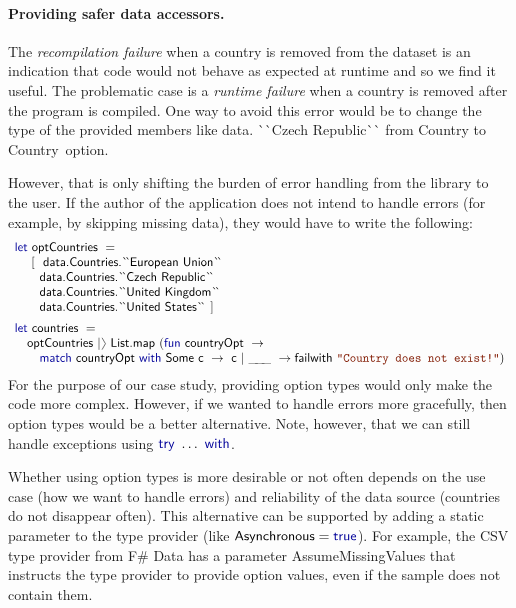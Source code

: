 \documentclass[submission,copyright,creativecommons]{eptcs}
\newcommand{\rangl}{\begin{picture}(4.5,7)
\put(.9,2.5){\rotatebox{120}{\line(1,0){5.5}}}
\put(.9,2.5){\rotatebox{240}{\line(1,0){5.5}}}
\end{picture}}
\newcommand{\ignp}{\_\kern-.5ex\_\kern-.5ex\_ }
\newcommand{\kvd}[1]{\textnormal{\textcolor{kvdclr}{\sffamily #1}}}
\newcommand{\str}[1]{\textnormal{\textcolor{strclr}{\ttfamily "#1"}}}
\newcommand{\ident}[1]{\textnormal{\sffamily #1}}
\newcommand{\lident}[1]{\textnormal{\sffamily
  \`{}\hspace{-0.25em}\`{}\hspace{-0.1em}#1\`{}\hspace{-0.25em}\`{}}}
\begin{document}
\vspace{-1em}
\paragraph{Providing safer data accessors.}
The \emph{recompilation failure} when a country is removed from the dataset is an indication that
code would not behave as expected at runtime and so we find it useful. The problematic case is
a \emph{runtime failure} when a country is removed after the program is compiled. One way to
avoid this error would be to change the type of the provided members like
\ident{data.}\lident{Czech Republic} from \ident{Country} to \ident{Country~option}.

However, that is only shifting the burden of error handling from the library to the user. If the
author of the application does not intend to handle errors (for example, by skipping missing data),
they would have to write the following:
%
\begin{equation*}
\begin{array}{l}
 \kvd{let}~\ident{optCountries}~= \\
 \quad~\lbrack~~ \ident{data.Countries.}\lident{European Union} \\
 \qquad   \ident{data.Countries.}\lident{Czech Republic} \\
 \qquad   \ident{data.Countries.}\lident{United Kingdom} \\
 \qquad   \ident{data.Countries.}\lident{United States} ~\rbrack
\\[0.5em]
 \kvd{let}~\ident{countries}~=\\
  \quad \ident{optCountries}~|\rangl~\ident{List.map}~(\kvd{fun}~\ident{countryOpt}~\rightarrow \\
  \qquad \kvd{match}~\ident{countryOpt}~\kvd{with}~\ident{Some~c}~\rightarrow~\ident{c}~|~\ignp~\rightarrow
    \ident{failwith}~\str{Country does not exist!})
\end{array}
\end{equation*}
%
For the purpose of our case study, providing option types would only make the code more complex.
However, if we wanted to handle errors more gracefully, then option types would be a better
alternative. Note, however, that we can still handle exceptions using $\kvd{try}~\ldots~\kvd{with}$.

Whether using option types is more desirable or not often depends on the use case (how we
want to handle errors) and reliability of the data source (countries do not disappear often).
This alternative can be supported by adding a static parameter to the type provider (like
$\ident{Asynchronous}=\kvd{true}$). For example, the CSV type provider from F\# Data has a
parameter \ident{AssumeMissingValues} that instructs the type provider to provide option values,
even if the sample does not contain them.
\end{document}
